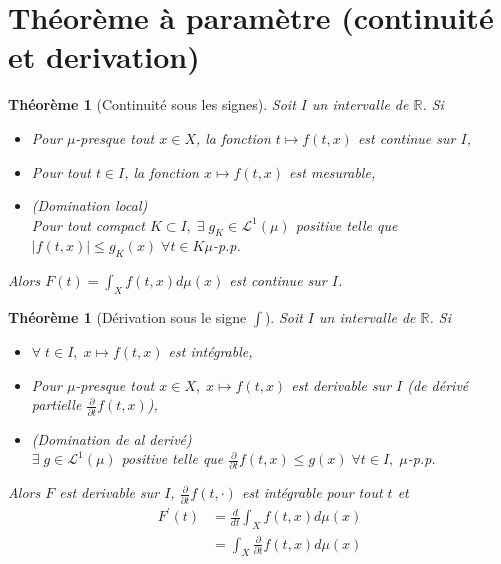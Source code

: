 \documentclass[a4paper,12pt,french]{report}
\theoremstyle{break}
\newtheorem{theo}[defin]{Théorème}
\begin{document}
\section{Théorème à paramètre (continuité et derivation)}
\begin{theo}[Continuité sous les signes]
       Soit $I$ un intervalle de $\mathbb{R}$. Si
       \begin{itemize}
              \item[i)] Pour $\mu$-presque tout $x \in X$, la fonction $t \mapsto f(t,x)$ est continue sur $I$,
              \item[ii)] Pour tout $t \in I$, la fonction $x \mapsto f(t,x)$ est mesurable,
              \item[iii)] (Domination local) \\Pour tout compact $K \subset I, \; \exists \; g_{K} \in \mathcal{L}^{1}(\mu)$ positive telle que $|f(t,x)| \leq g_{K}(x) \; \forall t \in K \mu$-p.p.
       \end{itemize}
       Alors $\displaystyle F(t) = \int_{X} f(t,x) d\mu(x)$ est continue sur $I$.
\end{theo}

\begin{theo}[Dérivation sous le signe $\int$]
       Soit $I$ un intervalle de $\mathbb{R}$. Si
       \begin{itemize}
              \item[i)] $\forall \; t \in I, \; x \mapsto f(t,x)$ est intégrable,
              \item[ii)] Pour $\mu$-presque tout $x \in X, \; x \mapsto f(t,x)$ est derivable sur $I$ (de dérivé partielle $\frac{\partial}{\partial t} f(t,x)$),
              \item[iii)] (Domination de al derivé) \\ $\exists \; g \in \mathcal{L}^{1}(\mu)$ positive telle que $\frac{\partial}{\partial t} f(t,x) \leq g(x) \; \forall t \in I, \; \mu$-p.p. 
       \end{itemize}
       Alors $F$ est derivable sur $I$, $\frac{\partial}{\partial t} f(t,\cdot)$ est intégrable pour tout $t$ et \begin{align*}  F^{'}(t)  & =  \frac{d}{dt} \int_{X} f(t,x) d\mu(x) \\ & =  \int_{X} \frac{\partial}{\partial t} f(t,x)d\mu(x)\end{align*}
\end{theo}
\end{document}
